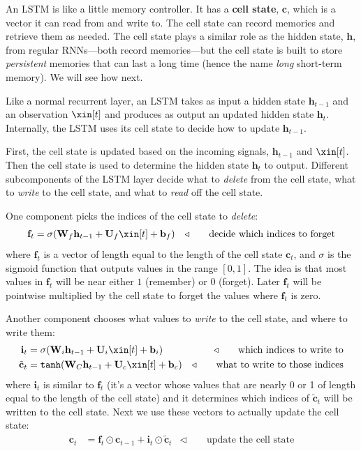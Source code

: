 An LSTM is like a little memory controller. It has a \textbf{cell state}, $\mathbf{c}$, which is a vector it can read from and write to. The cell state can record memories and retrieve them as needed. The cell state plays a similar role as the hidden state, $\mathbf{h}$, from regular RNNs—both record memories—but the cell state is built to store \textit{persistent} memories that can last a long time (hence the name \textit{long} short-term memory). We will see how next.

Like a normal recurrent layer, an LSTM takes as input a hidden state $\mathbf{h}_{t-1}$ and an observation $\xin[t]$ and produces as output an updated hidden state $\mathbf{h}_t$. Internally, the LSTM uses its cell state to decide how to update $\mathbf{h}_{t-1}$.

First, the cell state is updated based on the incoming signals, $\mathbf{h}_{t-1}$ and $\xin[t]$. Then the cell state is used to determine the hidden state $\mathbf{h}_{t}$ to output. Different subcomponents of the LSTM layer decide what to \textit{delete} from the cell state, what to \textit{write} to the cell state, and what to \textit{read} off the cell state. 

One component picks the indices of the cell state to \textit{delete}:
\begin{align}
    \mathbf{f}_t &= \sigma(\mathbf{W}_f\mathbf{h}_{t-1} + \mathbf{U}_f\xin[t] + \mathbf{b}_f) &\triangleleft \quad\quad\text{decide which indices to forget}
\end{align}
where $\mathbf{f}_t$ is a vector of length equal to the length of the cell state $\mathbf{c}_t$, and $\sigma$ is the sigmoid function that outputs values in the range $[0,1]$. The idea is that most values in $\mathbf{f}_t$ will be near either $1$ (remember) or 0 (forget). Later $\mathbf{f}_t$ will be pointwise multiplied by the cell state to forget the values where $\mathbf{f}_t$ is zero.

Another component chooses what values to \textit{write} to the cell state, and where to write them:
\begin{align}
    \mathbf{i}_t &= \sigma(\mathbf{W}_i\mathbf{h}_{t-1} + \mathbf{U}_i\xin[t] + \mathbf{b}_i) &\triangleleft \quad\quad\text{which indices to write to}\\
    \tilde{\mathbf{c}}_t &= \texttt{tanh}(\mathbf{W}_C\mathbf{h}_{t-1} + \mathbf{U}_c\xin[t] + \mathbf{b}_c) &\triangleleft \quad\quad\text{what to write to those indices}
\end{align}
where $\mathbf{i}_t$ is similar to $\mathbf{f}_t$ (it's a vector whose values that are nearly 0 or 1 of length equal to the length of the cell state) and it determines which indices of $\tilde{\mathbf{c}}_t$ will be written to the cell state. Next we use these vectors to actually update the cell state:
\begin{align}
    \mathbf{c}_t &= \mathbf{f}_t \odot \mathbf{c}_{t-1} + \mathbf{i}_t \odot \tilde{\mathbf{c}}_{t} &\triangleleft \quad\quad\text{update the cell state}
\end{align}


